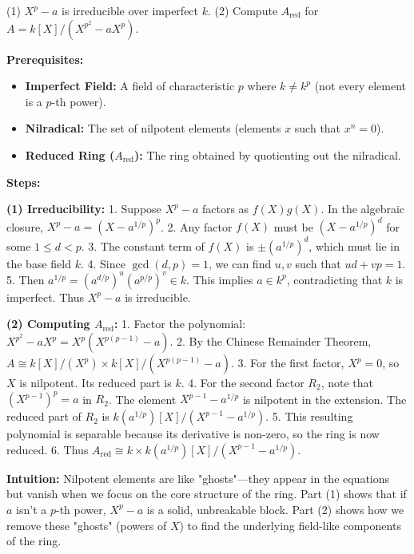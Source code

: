 \begin{exercise}
\label{algebra:2024:3}
(1) $X^p - a$ is irreducible over imperfect $k$.
(2) Compute $A_{\mathrm{red}}$ for $A = k[X]/(X^{p^2} - aX^p)$.
\end{exercise}

\begin{solution}
\textbf{Prerequisites:}
\begin{itemize}
    \item \textbf{Imperfect Field:} A field of characteristic $p$ where $k \neq k^p$ (not every element is a $p$-th power).
    \item \textbf{Nilradical:} The set of nilpotent elements (elements $x$ such that $x^n=0$).
    \item \textbf{Reduced Ring ($A_{\text{red}}$):} The ring obtained by quotienting out the nilradical.
\end{itemize}

\textbf{Steps:}

\textbf{(1) Irreducibility:}
1. Suppose $X^p - a$ factors as $f(X)g(X)$. In the algebraic closure, $X^p - a = (X - a^{1/p})^p$.
2. Any factor $f(X)$ must be $(X - a^{1/p})^d$ for some $1 \leq d < p$.
3. The constant term of $f(X)$ is $\pm (a^{1/p})^d$, which must lie in the base field $k$.
4. Since $\gcd(d, p) = 1$, we can find $u, v$ such that $ud + vp = 1$.
5. Then $a^{1/p} = (a^{d/p})^u (a^{p/p})^v \in k$. This implies $a \in k^p$, contradicting that $k$ is imperfect. Thus $X^p - a$ is irreducible.

\textbf{(2) Computing $A_{\text{red}}$:}
1. Factor the polynomial: $X^{p^2} - aX^p = X^p(X^{p(p-1)} - a)$.
2. By the Chinese Remainder Theorem, $A \cong k[X]/(X^p) \times k[X]/(X^{p(p-1)} - a)$.
3. For the first factor, $X^p = 0$, so $X$ is nilpotent. Its reduced part is $k$.
4. For the second factor $R_2$, note that $(X^{p-1})^p = a$ in $R_2$. The element $X^{p-1} - a^{1/p}$ is nilpotent in the extension. The reduced part of $R_2$ is $k(a^{1/p})[X]/(X^{p-1} - a^{1/p})$.
5. This resulting polynomial is separable because its derivative is non-zero, so the ring is now reduced.
6. Thus $A_{\text{red}} \cong k \times k(a^{1/p})[X]/(X^{p-1} - a^{1/p})$.

\textbf{Intuition:}
Nilpotent elements are like "ghosts"—they appear in the equations but vanish when we focus on the core structure of the ring. Part (1) shows that if $a$ isn't a $p$-th power, $X^p-a$ is a solid, unbreakable block. Part (2) shows how we remove these "ghosts" (powers of $X$) to find the underlying field-like components of the ring.
\end{solution}

